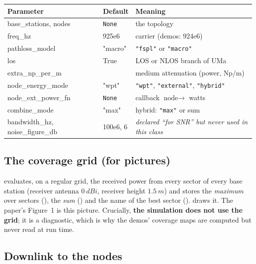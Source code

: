\begin{center}
\small
\renewcommand{\arraystretch}{1.12}
\begin{tabularx}{\linewidth}{@{}>{\ttfamily}p{3.7cm}>{\ttfamily}p{2.1cm}X@{}}
\toprule
\normalfont\bfseries Parameter & \normalfont\bfseries Default & \normalfont\bfseries Meaning\\
\midrule
base\_stations, nodes & \texttt{None} & the topology\\
freq\_hz & 925e6 & carrier (demos: 924e6)\\
pathloss\_model & "macro" & \texttt{"fspl"} or \texttt{"macro"}\\
los & True & LOS or NLOS branch of UMa\\
extra\_np\_per\_m & 0 & medium attenuation (power, Np/m)\\
node\_energy\_mode & "wpt" & \texttt{"wpt"}, \texttt{"external"}, \texttt{"hybrid"}\\
node\_ext\_power\_fn & \texttt{None} & callback $\text{node}\to$ watts\\
combine\_mode & "max" & hybrid: \texttt{"max"} or sum\\
bandwidth\_hz, noise\_figure\_db & 100e6, 6 & \emph{declared ``for SNR'' but never used in this class}\\
\bottomrule
\end{tabularx}
\end{center}

\subsection{The coverage grid (for pictures)}

 evaluates, on a regular grid, the received power from every sector of every base station (receiver antenna $\SI{0}{dBi}$, receiver height $\SI{1.5}{m}$) and stores the \emph{maximum} over sectors (), the \emph{sum} () and the name of the best sector ().  draws it. The paper's Figure~1 is this picture. Crucially, \textbf{the simulation does not use the grid}; it is a diagnostic, which is why the demos' coverage maps are computed but never read at run time.

\subsection{Downlink to the nodes}

